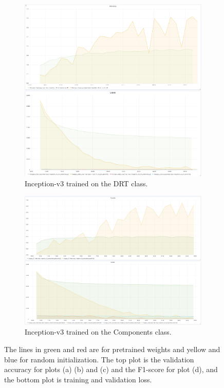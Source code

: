 \begin{figure}
\begin{subfigure}{.5\textwidth}
  \centering
  \includegraphics[width=.8\linewidth]{figures/04-go_drt_acc.PNG}
  \caption{Inception-v3 trained on the DRT class.}
  \label{fig:googinit_drt}
\end{subfigure}%
\begin{subfigure}{.5\textwidth}
  \centering
  \includegraphics[width=.8\linewidth]{figures/04-go_conponents_acc.PNG}
  \caption{Inception-v3 trained on the Components class.}
  \label{fig:googinit_compo}
\end{subfigure}
\caption[Training and validation plots for Inception-v3]{The lines in green and red are for pretrained weights and yellow and blue for random initialization. The top plot is the validation accuracy for plots (a) (b) and (c) and the F1-score for plot (d), and the bottom plot is training  and validation loss.}
\label{fig:plotsgoog}
\end{figure}

